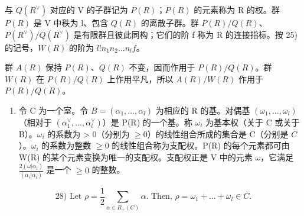 与 \(Q(R^{\vee})\) 对应的 V 的子群记为 \(P(R)\)；\(P(R)\) 的元素称为 R 的权。群 \(P(R)\) 是 V 中秩为 l、包含 \(Q(R)\) 的离散子群。群 \(P(R)/Q(R)\)、\(P(R^{\vee})/Q(R^{\vee})\) 是有限群且彼此同构；它们的阶 f 称为 R 的连接指标。按 25) 的记号，\(W(R)\) 的阶为 \(l!n_{1}n_{2}\ldots n_{l}f\)。

群 \(A(R)\) 保持 \(P(R)\)、\(Q(R)\) 不变，因而作用于 \(P(R)/Q(R)\)。群 \(W(R)\) 在 \(P(R)/Q(R)\) 上作用平凡，所以 \(A(R)/W(R)\) 作用于 \(P(R)/Q(R)\)。

\begin{enumerate}
\def\labelenumi{\arabic{enumi})}
\setcounter{enumi}{26}
\tightlist
\item
  令 C 为一个室。令 \(B = (\alpha_{1}, \ldots, \alpha_{l})\) 为相应的 R 的基。对偶基 \((\omega_{1}, \ldots, \omega_{l})\)（相对于 \((\alpha_{1}^{\vee}, \ldots, \alpha_{l}^{\vee})\)）是 P(R) 的一个基。称 \(\omega_{i}\) 为基本权（关于 C 或关于 B）。\(\omega_{i}\) 的系数为 \textgreater{} 0（分别为 \(\geqslant 0\)）的线性组合所成的集合是 C（分别是 \(\overline{C}\)）。\(\omega_{i}\) 的系数为整数 \(\geqslant 0\) 的线性组合称为支配权。P(R) 的每个元素都可由 W(R) 的某个元素变换为唯一的支配权。支配权正是 V 中的元素 \(\omega\)，它满足 \(\frac{2(\omega|\alpha_{i})}{(\alpha_{i}|\alpha_{i})}\) 是一个 \(\geqslant 0\) 的整数。
\end{enumerate}

\[
28) \text {   Let   } \rho = \frac {1}{2} \sum_ {\alpha \in R _ {+} (C)} \alpha . \text {   Then,   } \rho = \omega_ {1} + \dots + \omega_ {l} \in C.
\]

